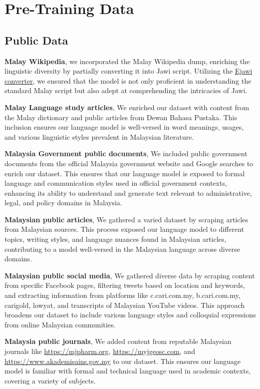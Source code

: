 \documentclass{article}
\begin{document}
\section{Pre-Training Data}

\subsection{Public Data}\label{sec:public-data}

\textbf{Malay Wikipedia}, we incorporated the Malay Wikipedia dump, enriching the linguistic diversity by partially converting it into Jawi script. Utilizing the \href{https://www.ejawi.net/converterV2.php?go=rumi}{Ejawi converter}, we ensured that the model is not only proficient in understanding the standard Malay script but also adept at comprehending the intricacies of Jawi.

\textbf{Malay Language study articles}, We enriched our dataset with content from the Malay dictionary and public articles from Dewan Bahasa Pustaka. This inclusion ensures our language model is well-versed in word meanings, usages, and various linguistic styles prevalent in Malaysian literature.

\textbf{Malaysia Government public documents}, We included public government documents from the official Malaysia government website and Google searches to enrich our dataset. This ensures that our language model is exposed to formal language and communication styles used in official government contexts, enhancing its ability to understand and generate text relevant to administrative, legal, and policy domains in Malaysia.

\textbf{Malaysian public articles}, We gathered a varied dataset by scraping articles from Malaysian sources. This process exposed our language model to different topics, writing styles, and language nuances found in Malaysian articles, contributing to a model well-versed in the Malaysian language across diverse domains.

\textbf{Malaysian public social media}, We gathered diverse data by scraping content from specific Facebook pages, filtering tweets based on location and keywords, and extracting information from platforms like c.cari.com.my, b.cari.com.my, carigold, lowyat, and transcripts of Malaysian YouTube videos. This approach broadens our dataset to include various language styles and colloquial expressions from online Malaysian communities.

\textbf{Malaysia public journals}, We added content from reputable Malaysian journals like \url{https://mjpharm.org}, \url{https://myjgeosc.com}, and \url{https://www.akademisains.gov.my} to our dataset. This ensures our language model is familiar with formal and technical language used in academic contexts, covering a variety of subjects.
\end{document}
